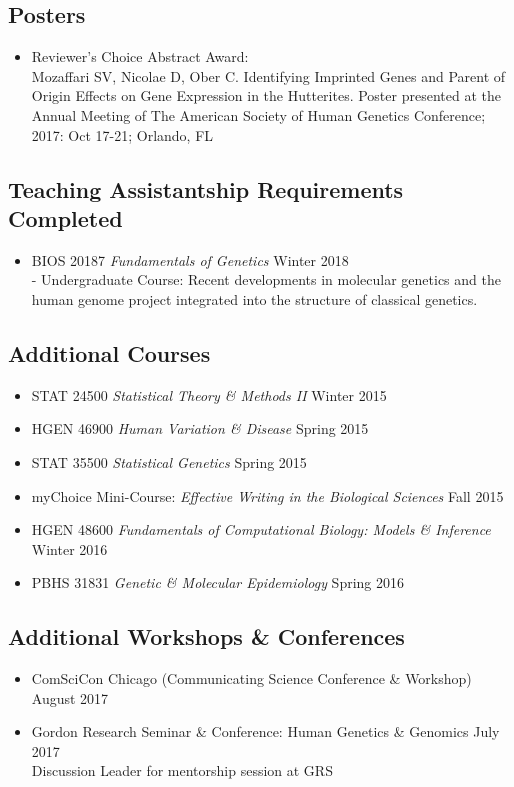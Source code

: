 \documentclass[a4paper, 11pt]{article}
\begin{document}
\subsection*{Posters}
\begin{itemize}
    \item Reviewer's Choice Abstract Award: \\Mozaffari SV, Nicolae D, Ober C. Identifying Imprinted Genes and Parent of Origin Effects on Gene Expression in the Hutterites. Poster presented at the Annual Meeting of The American Society of Human Genetics Conference; 2017: Oct 17-21; Orlando, FL

\end{itemize}

\subsection*{Teaching Assistantship Requirements Completed}
\begin{itemize}
	\item BIOS 20187 \emph{Fundamentals of Genetics} \hfill Winter 2018\\
		- Undergraduate Course: Recent developments in molecular genetics and the human genome project integrated into the structure of classical genetics.
\end{itemize}


\subsection*{Additional Courses}
\begin{itemize}
    \item STAT 24500 \emph{Statistical Theory \& Methods II }\hfill Winter 2015
    \item HGEN 46900 \emph{Human Variation \& Disease} \hfill Spring 2015
    \item STAT 35500 \emph{Statistical Genetics} \hfill Spring 2015
    \item myChoice Mini-Course: \emph{Effective Writing in the Biological Sciences} \hfill Fall 2015
    \item HGEN 48600 \emph{Fundamentals of Computational Biology: Models \& Inference} \hfill Winter 2016
    \item PBHS 31831 \emph{Genetic \& Molecular Epidemiology} \hfill Spring 2016

\end{itemize}

\subsection*{Additional Workshops \& Conferences}
\begin{itemize}
	\item ComSciCon Chicago (Communicating Science Conference \& Workshop)  \hfill August 2017
	\item Gordon Research Seminar \& Conference: Human Genetics \& Genomics \hfill July 2017 \\ Discussion Leader for mentorship session at GRS
\end{itemize}
\end{document}
